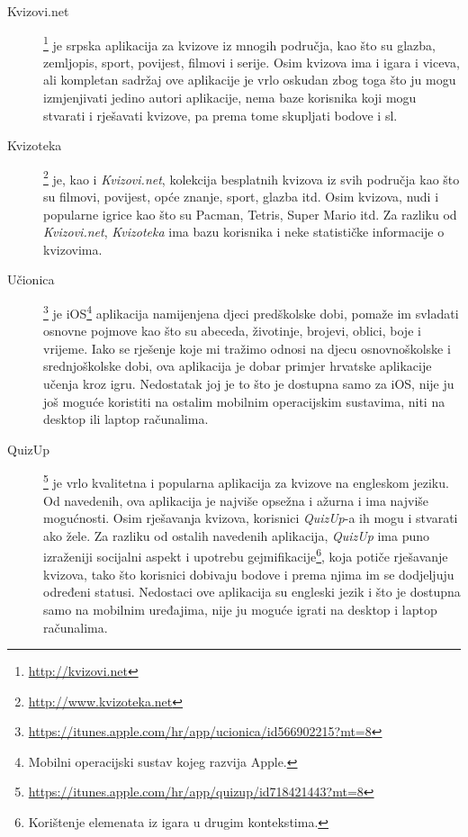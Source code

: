 \documentclass{scrreprt}
\begin{document}
\begin{description}

  \item[Kvizovi.net]\footnote{\url{http://kvizovi.net}} je srpska aplikacija za
    kvizove iz mnogih područja, kao što su glazba, zemljopis, sport, povijest,
    filmovi i serije. Osim kvizova ima i igara i viceva, ali kompletan sadržaj
    ove aplikacije je vrlo oskudan zbog toga što ju mogu izmjenjivati jedino
    autori aplikacije, nema baze korisnika koji mogu stvarati i rješavati
    kvizove, pa prema tome skupljati bodove i sl.

  \item[Kvizoteka]\footnote{\url{http://www.kvizoteka.net}} je, kao i
    \emph{Kvizovi.net}, kolekcija besplatnih kvizova iz svih područja kao što su
    filmovi, povijest, opće znanje, sport, glazba itd. Osim kvizova, nudi i
    popularne igrice kao što su Pacman, Tetris, Super Mario itd. Za razliku od
    \emph{Kvizovi.net}, \emph{Kvizoteka} ima bazu korisnika i neke statističke
    informacije o kvizovima.

  \item[Učionica]\footnote{\url{https://itunes.apple.com/hr/app/ucionica/id566902215?mt=8}}
    je iOS\footnote{Mobilni operacijski sustav kojeg razvija Apple.} aplikacija
    namijenjena djeci predškolske dobi, pomaže im svladati osnovne pojmove kao
    što su abeceda, životinje, brojevi, oblici, boje i vrijeme. Iako se
    rješenje koje mi tražimo odnosi na djecu osnovnoškolske i srednjoškolske
    dobi, ova aplikacija je dobar primjer hrvatske aplikacije učenja kroz igru.
    Nedostatak joj je to što je dostupna samo za iOS, nije ju još moguće
    koristiti na ostalim mobilnim operacijskim sustavima, niti na desktop ili
    laptop računalima.

  \item[QuizUp]\footnote{\url{https://itunes.apple.com/hr/app/quizup/id718421443?mt=8}}
    je vrlo kvalitetna i popularna aplikacija za kvizove na engleskom jeziku.
    Od navedenih, ova aplikacija je najviše opsežna i ažurna i ima najviše
    mogućnosti. Osim rješavanja kvizova, korisnici \emph{QuizUp}-a ih mogu i
    stvarati ako žele. Za razliku od ostalih navedenih aplikacija, \emph{QuizUp}
    ima puno izraženiji socijalni aspekt i upotrebu
    gejmifikacije\footnote{Korištenje elemenata iz igara u drugim kontekstima.},
    koja potiče rješavanje kvizova, tako što korisnici dobivaju bodove i prema
    njima im se dodjeljuju određeni statusi. Nedostaci ove aplikacija su
    engleski jezik i što je dostupna samo na mobilnim uređajima, nije ju moguće
    igrati na desktop i laptop računalima.

\end{description}
\end{document}
